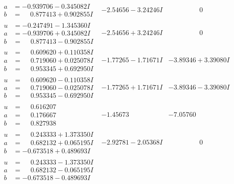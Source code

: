 \documentclass[1p]{elsarticle_modified}
\theoremstyle{definition}
\begin{document}
$$\begin{array}{c|c|c}
\begin{aligned}
a &= -0.939706 - 0.345082 I \\
b &= \phantom{-}0.877413 + 0.902855 I\end{aligned}
 & -2.54656 - 3.24246 I & \phantom{-0.000000 } 0 \\ \hline\begin{aligned}
u &= -0.247491 - 1.345360 I \\
a &= -0.939706 + 0.345082 I \\
b &= \phantom{-}0.877413 - 0.902855 I\end{aligned}
 & -2.54656 + 3.24246 I & \phantom{-0.000000 } 0 \\ \hline\begin{aligned}
u &= \phantom{-}0.609620 + 0.110358 I \\
a &= \phantom{-}0.719060 + 0.025078 I \\
b &= \phantom{-}0.953345 + 0.692950 I\end{aligned}
 & -1.77265 - 1.71671 I & -3.89346 + 3.39080 I \\ \hline\begin{aligned}
u &= \phantom{-}0.609620 - 0.110358 I \\
a &= \phantom{-}0.719060 - 0.025078 I \\
b &= \phantom{-}0.953345 - 0.692950 I\end{aligned}
 & -1.77265 + 1.71671 I & -3.89346 - 3.39080 I \\ \hline\begin{aligned}
u &= \phantom{-}0.616207\phantom{ +0.000000I} \\
a &= \phantom{-}0.176667\phantom{ +0.000000I} \\
b &= \phantom{-}0.827938\phantom{ +0.000000I}\end{aligned}
 & -1.45673\phantom{ +0.000000I} & -7.05760\phantom{ +0.000000I} \\ \hline\begin{aligned}
u &= \phantom{-}0.243333 + 1.373350 I \\
a &= \phantom{-}0.682132 + 0.065195 I \\
b &= -0.673518 + 0.489693 I\end{aligned}
 & -2.92781 - 2.05368 I & \phantom{-0.000000 } 0 \\ \hline\begin{aligned}
u &= \phantom{-}0.243333 - 1.373350 I \\
a &= \phantom{-}0.682132 - 0.065195 I \\
b &= -0.673518 - 0.489693 I\end{aligned}

\end{array}$$
\end{document}
